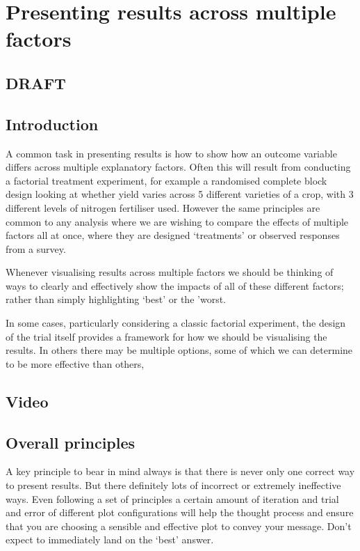 \documentclass[
]{book}
\begin{document}
\hypertarget{factor}{%
\chapter{Presenting results across multiple factors}\label{factor}}

\hypertarget{draft-1}{%
\section{DRAFT}\label{draft-1}}

\hypertarget{introduction-1}{%
\section{Introduction}\label{introduction-1}}

A common task in presenting results is how to show how an outcome variable differs across multiple explanatory factors. Often this will result from conducting a factorial treatment experiment, for example a randomised complete block design looking at whether yield varies across 5 different varieties of a crop, with 3 different levels of nitrogen fertiliser used. However the same principles are common to any analysis where we are wishing to compare the effects of multiple factors all at once, where they are designed `treatments' or observed responses from a survey.

Whenever visualising results across multiple factors we should be thinking of ways to clearly and effectively show the impacts of all of these different factors; rather than simply highlighting `best' or the 'worst.

In some cases, particularly considering a classic factorial experiment, the design of the trial itself provides a framework for how we should be visualising the results. In others there may be multiple options, some of which we can determine to be more effective than others,

\hypertarget{video}{%
\section{Video}\label{video}}

\hypertarget{overall-principles}{%
\section{Overall principles}\label{overall-principles}}

A key principle to bear in mind always is that there is never only one correct way to present results. But there definitely lots of incorrect or extremely ineffective ways. Even following a set of principles a certain amount of iteration and trial and error of different plot configurations will help the thought process and ensure that you are choosing a sensible and effective plot to convey your message. Don't expect to immediately land on the `best' answer.
\end{document}
